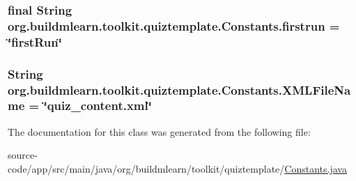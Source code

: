 \subsubsection[{\texorpdfstring{firstrun}{firstrun}}]{\setlength{\rightskip}{0pt plus 5cm}final String org.\+buildmlearn.\+toolkit.\+quiztemplate.\+Constants.\+firstrun = \char`\"{}first\+Run\char`\"{}\hspace{0.3cm}{\ttfamily [static]}}\hypertarget{classorg_1_1buildmlearn_1_1toolkit_1_1quiztemplate_1_1Constants_ac2bdb3269ee1e40c4cd2d5856050b096}{}\label{classorg_1_1buildmlearn_1_1toolkit_1_1quiztemplate_1_1Constants_ac2bdb3269ee1e40c4cd2d5856050b096}
\subsubsection[{\texorpdfstring{X\+M\+L\+File\+Name}{XMLFileName}}]{\setlength{\rightskip}{0pt plus 5cm}String org.\+buildmlearn.\+toolkit.\+quiztemplate.\+Constants.\+X\+M\+L\+File\+Name = \char`\"{}quiz\+\_\+content.\+xml\char`\"{}\hspace{0.3cm}{\ttfamily [static]}}\hypertarget{classorg_1_1buildmlearn_1_1toolkit_1_1quiztemplate_1_1Constants_ace22a76c04ad5105d7dc8fb3acfc1855}{}\label{classorg_1_1buildmlearn_1_1toolkit_1_1quiztemplate_1_1Constants_ace22a76c04ad5105d7dc8fb3acfc1855}


The documentation for this class was generated from the following file\+:\begin{DoxyCompactItemize}
\item 
source-\/code/app/src/main/java/org/buildmlearn/toolkit/quiztemplate/\hyperlink{quiztemplate_2Constants_8java}{Constants.\+java}\end{DoxyCompactItemize}
